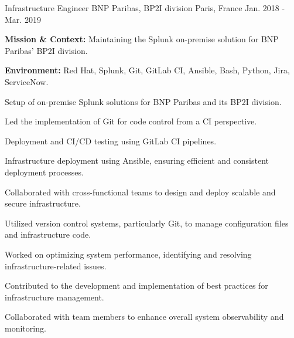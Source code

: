\begin{cventries}
\cventry
{Infrastructure Engineer} %
{BNP Paribas, BP2I division} %
{Paris, France} %
{Jan. 2018 - Mar. 2019} %
{
  \begin{cvitems} %
    \item {\textbf{Mission \& Context:} Maintaining the Splunk on-premise solution for BNP Paribas' BP2I division.}
    \item {\textbf{Environment:} Red Hat, Splunk, Git, GitLab CI, Ansible, Bash, Python, Jira, ServiceNow.}
    \item {Setup of on-premise Splunk solutions for BNP Paribas and its BP2I division.}
    \item {Led the implementation of Git for code control from a CI perspective.}
    \item {Deployment and CI/CD testing using GitLab CI pipelines.}
    \item {Infrastructure deployment using Ansible, ensuring efficient and consistent deployment processes.}
    \item {Collaborated with cross-functional teams to design and deploy scalable and secure infrastructure.}
    \item {Utilized version control systems, particularly Git, to manage configuration files and infrastructure code.}
    \item {Worked on optimizing system performance, identifying and resolving infrastructure-related issues.}
    \item {Contributed to the development and implementation of best practices for infrastructure management.}
    \item {Collaborated with team members to enhance overall system observability and monitoring.}
  \end{cvitems}
}


\end{cventries}
